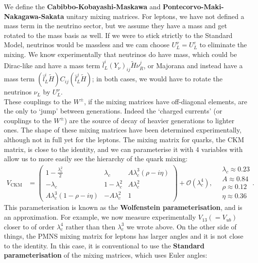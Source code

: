 \documentclass[relqm.tex]{subfiles}
\begin{document}
We define the \textbf{Cabibbo-Kobayashi-Maskawa} and \textbf{Pontecorvo-Maki-Nakagawa-Sakata} unitary mixing matrices. 
For leptons, we have not defined a mass term in the neutrino sector, but we assume they have a mass and get rotated to the mass basis as well. 
If we were to stick strictly to the Standard Model, neutrinos would be massless and we cam choose $U_L^\nu=U_L^e$ to eliminate the mixing. 
We know experimentally that neutrinos do have mass, which could be Dirac-like and have a mass term $\bar{l}_L^i(Y_\nu)_{ij}\tilde{H}\nu_R^j$, or Majorana and instead have a mass term $(\bar{l}_L^i\tilde{H})C_{ij}(\bar{l}_L^j\tilde{H})$; in both cases, we would have to rotate the neutrinos $\nu_L$ by $U_L^\nu$.\\
These couplings to the $W^\pm$, if the mixing matrices have off-diagonal elements, are the only to `jump' between generations. 
Indeed the `charged currents' (or couplings to the $W^\pm$) are the source of decay of heavier generations to lighter ones. 
The shape of these mixing matrices have been determined experimentally, although not in full yet for the leptons. 
The mixing matrix for quarks, the CKM matrix, is close to the identity, and we can parameterise it with 4 variables with allow us to more easily see the hierarchy of the quark mixing:
\begin{align}
    V_{\text{CKM}} &= \begin{pmatrix} 1 - \frac{\lambda_c^2}{2} & \lambda_c & A\lambda_c^3(\rho-i\eta) \\ -\lambda_c & 1-\lambda_c^2 & A\lambda_c^2 \\ A\lambda_c^3(1-\rho-i\eta) & -A\lambda_c^2 & 1 \end{pmatrix} + \mathcal{O}(\lambda_c^4),\quad \begin{matrix} \lambda_c \approx 0.23 \\ A \approx 0.84 \\ \rho\approx0.12 \\ \eta\approx0.36\end{matrix}.
\end{align}
This parameterisation is known as the \textbf{Wolfenstein parameterisation}, and is an approximation. 
For example, we now measure experimentally $V_{13}(=V_{ub})$ closer to of order $\lambda_c^4$ rather than then $\lambda_c^3$ we wrote above.
On the other side of things, the PMNS mixing matrix for leptons has larger angles and it is not close to the identity. 
In this case, it is conventional to use the \textbf{Standard parameterisation} of the mixing matrices, which uses Euler angles:
\end{document}
